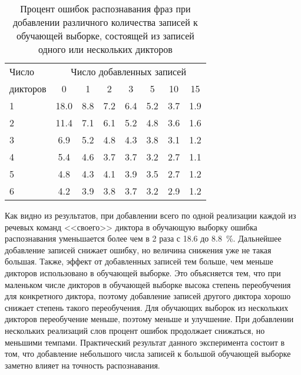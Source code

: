 \begin{table}[h]
	\centering
	\caption{Процент ошибок распознавания фраз при добавлении различного количества записей к обучающей выборке, состоящей из записей одного или нескольких дикторов}
	\label{tab:cnn_phrases_addition}
	\begin{tabular}{| l | c | c | c | c | c | c | c |}
		\hline
		Число & \multicolumn{7}{c|}{Число добавленных записей} \\
		\hhline{~-------}
		дикторов \phantom{000} & \phantom{00} 0 \phantom{00} & \phantom{00} 1 \phantom{00} & \phantom{00} 2 \phantom{00} & \phantom{00} 3 \phantom{00} & \phantom{00} 5 \phantom{00} & \phantom{00} 10 \phantom{00} & \phantom{00} 15 \phantom{00} \\
		\hline
		1 		 & 18.0 & 8.8 & 7.2 & 6.4 & 5.2 & 3.7 & 1.9 \\
		2 		 & 11.4 & 7.1 & 6.1 & 5.2 & 4.8 & 3.6 & 1.6 \\
		3 		 &  6.9 & 5.2 & 4.8 & 4.3 & 3.8 & 3.1 & 1.2 \\
		4 		 &  5.4 & 4.6 & 3.7 & 3.7 & 3.2 & 2.7 & 1.1 \\
		5 		 &  4.8 & 4.3 & 4.1 & 3.9 & 3.5 & 2.7 & 1.2 \\
		6 		 &  4.2 & 3.9 & 3.8 & 3.7 & 3.2 & 2.9 & 1.2 \\
		\hline
	\end{tabular}
\end{table}

Как видно из результатов, при добавлении всего по одной реализации каждой из речевых команд <<своего>> диктора в обучающую выборку ошибка распознавания уменьшается более чем в 2 раза с 18.6 до 8.8~\%.
Дальнейшее добавление записей снижает ошибку, но величина снижения уже не такая большая.
Также, эффект от добавленных записей тем больше, чем меньше дикторов использовано в обучающей выборке.
Это объясняется тем, что при маленьком числе дикторов в обучающей выборке высока степень переобучения для конкретного диктора, поэтому добавление записей другого диктора хорошо снижает степень такого переобучения.
Для обучающих выборок из нескольких дикторов переобучение меньше, поэтому меньше и улучшение.
При добавлении нескольких реализаций слов процент ошибок продолжает снижаться, но меньшими темпами.
Практический результат данного эксперимента состоит в том, что добавление небольшого числа записей к большой обучающей выборке заметно влияет на точность распознавания.


